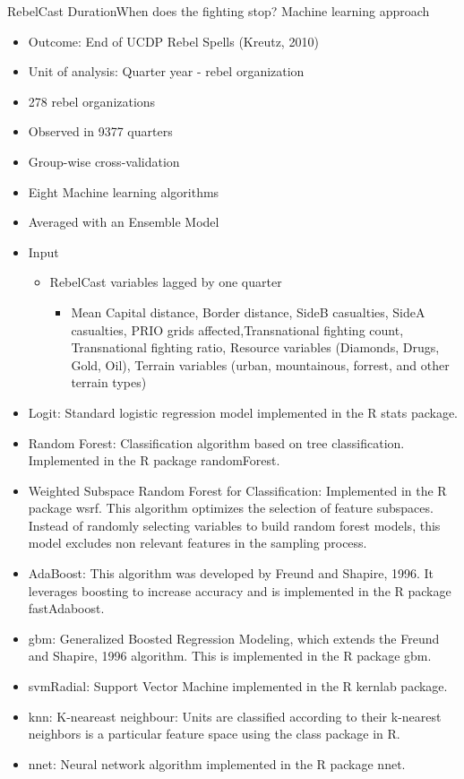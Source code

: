 \documentclass{beamer}
\begin{document}
\begin{frame}{RebelCast Duration}{When does the fighting stop?}
Machine learning approach
\begin{itemize}
\item Outcome: End of UCDP Rebel Spells (Kreutz, 2010)
\item Unit of analysis: Quarter year - rebel organization
\item 278 rebel organizations
\item Observed in 9377 quarters
\item Group-wise cross-validation
\item Eight Machine learning algorithms
\item Averaged with an Ensemble Model
\item Input
\begin{itemize}
\item RebelCast variables lagged by one quarter
\begin{itemize}
\item Mean Capital distance, Border distance, SideB casualties, SideA casualties, PRIO grids affected,Transnational fighting count, Transnational fighting ratio, Resource variables (Diamonds, Drugs, Gold, Oil), Terrain variables (urban, mountainous, forrest, and other terrain types) 
\end{itemize}
\end{itemize}
\end{itemize}
\end{frame}


\begin{frame}
\begin{itemize}
\item{Logit: Standard logistic regression model implemented in the R stats package.}
\item{Random Forest: Classification algorithm based on tree classification. Implemented in the R package randomForest.}
\item{Weighted Subspace Random Forest for Classification: Implemented in the R package wsrf. This algorithm optimizes the selection of feature subspaces. Instead of randomly selecting variables to build random forest models, this model excludes non relevant features in the sampling process.}
\item{AdaBoost: This algorithm was developed by Freund and Shapire, 1996. It leverages boosting to increase accuracy and is implemented in the R package fastAdaboost.}
\item{gbm: Generalized Boosted Regression Modeling, which extends the Freund and Shapire, 1996 algorithm. This is implemented in the R package gbm.}
\item{svmRadial: Support Vector Machine implemented in the R kernlab package.}
\item{knn: K-neareast neighbour}: Units are classified according to their k-nearest neighbors is a particular feature space using the class package in R.
\item{nnet: Neural network algorithm implemented in the R package nnet.}
\end{itemize}
\end{frame}
\end{document}
